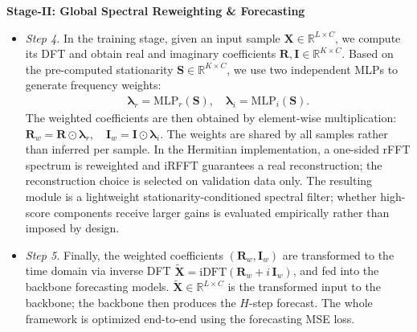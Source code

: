 \documentclass[sigconf,anonymous,review]{acmart}
\begin{document}
\noindent\textbf{Stage-II: Global Spectral Reweighting \& Forecasting}
\begin{itemize}[leftmargin=1.5em]
    \item \emph{Step 4.} In the training stage, given an input sample $\mathbf{X}\in\mathbb{R}^{L\times C}$, we compute its DFT and obtain real and imaginary coefficients $\mathbf{R},\mathbf{I}\in\mathbb{R}^{K\times C}$. 
    Based on the pre-computed stationarity $\mathbf{S}\in\mathbb{R}^{K\times C}$, we use two independent MLPs to generate frequency weights:
    \begin{align}
    \mathbf{\lambda}_r=\mathrm{MLP}_r(\mathbf{S}),\quad
    \mathbf{\lambda}_i=\mathrm{MLP}_i(\mathbf{S}). \label{eq:lambas}
    \end{align}
    The weighted coefficients are then obtained by element-wise multiplication:
    $\mathbf{R}_w=\mathbf{R}\odot\mathbf{\lambda}_r,\quad
    \mathbf{I}_w=\mathbf{I}\odot\mathbf{\lambda}_i.$
    The weights are shared by all samples rather than inferred per sample. In the
    Hermitian implementation, a one-sided rFFT spectrum is reweighted and iRFFT
    guarantees a real reconstruction; the reconstruction choice is selected on
    validation data only. The resulting module is a lightweight
    stationarity-conditioned spectral filter; whether high-score components
    receive larger gains is evaluated empirically rather than imposed by design.
    \item \emph{Step 5.} Finally, the weighted coefficients $(\mathbf{R}_w,\mathbf{I}_w)$ are transformed to the time domain via inverse DFT 
    $\widetilde{\mathbf{X}}=\mathrm{iDFT}(\mathbf{R}_w+i\,\mathbf{I}_w)$,
    and fed into the backbone forecasting models. 
    $\widetilde{\mathbf{X}}\in\mathbb{R}^{L\times C}$ is the transformed input to the backbone; the backbone then produces the $H$-step forecast.
    The whole framework is optimized end-to-end using the forecasting MSE loss.  
\end{itemize}





\end{document}
